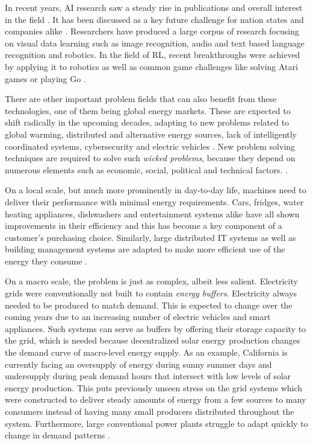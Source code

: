 
In recent years, \ac{AI} research saw a steady rise in publications and overall interest in the field
\cite[]{arulkumaran2017brief, russell2016artificial}.
It has been discussed as a key future challenge for nation states and companies alike
\cite[]{mozur_markoff_2017, faznetchina_2018}. Researchers have produced a large corpus of research focusing on visual
data learning such as image recognition, audio and text based language recognition and robotics. In the field of
\ac{RL}, recent breakthroughs were achieved by applying it to robotics as well as common game challenges like solving Atari games or
playing Go
\cite[]{arulkumaran2017brief}.

There are other important problem fields that can also benefit from these technologies, one of them being global energy markets.
These are expected to shift radically in the upcoming decades, adapting to new problems related to global warming,
distributed and alternative energy sources, lack of intelligently coordinated systems, cybersecurity  and electric vehicles \cite[p.10ff.]{mitei2011}. New problem solving techniques are required to solve such \emph{wicked problems}, because
they depend on numerous elements such as economic, social, political and technical factors.
\cite[]{ketter2015competitive}.

On a local scale, but much more prominently in day-to-day life, machines need to deliver their performance with minimal energy requirements. Cars, fridges, water heating
appliances, dishwashers and entertainment systems alike have all shown improvements in their efficiency and this has
become a key component of a customer's purchasing choice.  Similarly, large distributed IT systems as well as building
management systems are adapted to make more efficient use of the energy they consume 
\cite[]{Orgerie:2014:STI:2597757.2532637, DePaola:2014:IMS:2620784.2611779}.

On a macro scale, the problem is just as complex, albeit less salient.  Electricity grids were conventionally not built
to contain \emph{energy buffers}. Electricity always needed to be produced to match demand. This is expected to change
over the coming years due to an increasing number of electric vehicles and smart appliances. Such systems can serve as buffers
by offering their storage capacity to the grid, which is needed because decentralized
solar energy production changes the demand curve of macro-level energy supply. As an example, California is currently
facing an
oversupply of energy during sunny summer days and undersupply during peak demand hours that intersect with low levels of
solar energy production. This puts previously unseen stress on the grid systems which were constructed to deliver steady amounts
of energy from a few sources to many consumers instead of having many small producers distributed throughout the system.
Furthermore, large conventional power plants struggle to adapt quickly to change in demand patterns
\cite[]{roberts_2016}.

